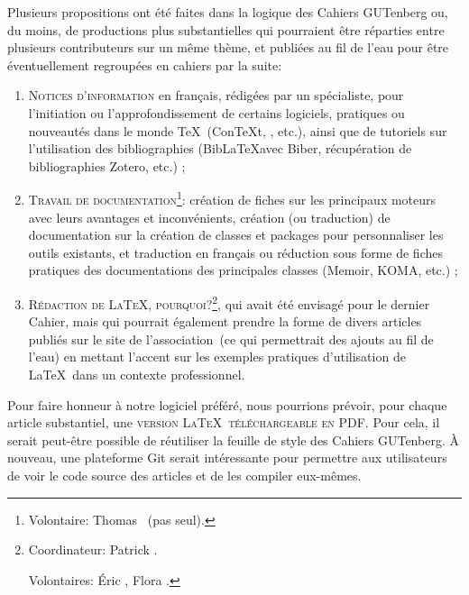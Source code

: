 \documentclass{tufte-handout}
\newcommand{\ratio}[3][]{\marginpar{\footnotesize{\textcolor{teal}{Temps requis: #2 / Utilité: #3}\par\noindent \textcolor{teal}{#1}}}}
\begin{document}
Plusieurs propositions\ratio[Contributions substantielles, mais réparties entre les auteurs]{+++}{+++} ont été faites dans la logique des Cahiers GUTenberg ou, du moins, de productions plus substantielles qui pourraient être réparties entre plusieurs contributeurs sur un même thème, et publiées au fil de l'eau pour être éventuellement regroupées en cahiers par la suite:

\begin{enumerate}
	\item\textsc{Notices d'information}\ratio[Individuellement assez peu chronophage, d'autant que certaines ressources existent]{++}{+++} en français, rédigées par un spécialiste, pour l'initiation ou l'approfondissement de certains logiciels, pratiques ou nouveautés dans le monde \TeX\ (Con\TeX t, \LuaTeX, etc.), ainsi que de tutoriels sur l'utilisation des bibliographies (Bib\LaTeX avec Biber, récupération de bibliographies Zotero, etc.) ;
	\item\textsc{Travail de documentation}\ratio[Plus ou moins chronophage selon les projets]{++}{+++}\footnote{Volontaire: Thomas ~(pas seul).}: création de fiches sur les principaux moteurs avec leurs avantages et inconvénients, création (ou traduction) de documentation sur la création de classes et packages pour personnaliser les outils existants, et traduction en français ou réduction sous forme de fiches pratiques des documentations des principales classes (Memoir, KOMA, etc.) ;
	\item\textsc{Rédaction de \LaTeX, pourquoi?}\ratio[Plusieurs contributions sont dans les tuyaux]{++}{+++}\footnote{Coordinateur: Patrick .\par\noindent Volontaires: Éric , Flora .}, qui avait été envisagé pour le dernier Cahier, mais qui pourrait également prendre la forme de divers articles publiés sur le site de l'association~(ce qui permettrait des ajouts au fil de l'eau) en mettant l'accent sur les exemples pratiques d'utilisation de \LaTeX\ dans un contexte professionnel.
\end{enumerate}

Pour faire honneur à notre logiciel préféré\ratio[Possibilité d'automatisation]{+}{+++}, nous pourrions prévoir, pour chaque article substantiel, une \textsc{version \LaTeX\ téléchargeable en PDF}. Pour cela, il serait peut-être possible de réutiliser la feuille de style des Cahiers GUTenberg. À nouveau, une plateforme Git serait intéressante pour permettre aux utilisateurs de voir le code source des articles et de les compiler eux-mêmes.
\end{document}
